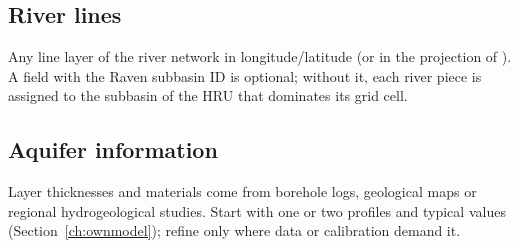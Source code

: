 \subsection{River lines}
Any line layer of the river network in longitude/latitude (or in the projection of ). A field with the Raven subbasin ID is optional; without it, each
river piece is assigned to the subbasin of the HRU that dominates its grid cell.
\subsection{Aquifer information}
Layer thicknesses and materials come from borehole logs, geological maps or regional hydrogeological studies. Start with one or
two profiles and typical values (Section~\ref{ch:ownmodel}); refine only where data or calibration demand it.

